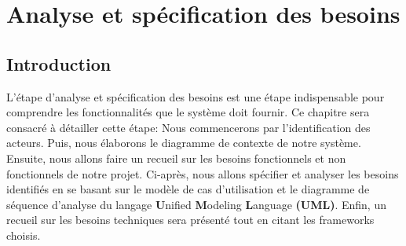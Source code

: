 \vfill 
\chapter{Analyse et spécification des besoins}
\label{chap:analyse-specification-besoins}
\mtcaddchapter
\section*{Introduction}
\justifying
L’étape d’analyse et spécification des besoins est une étape indispensable pour comprendre les fonctionnalités que le système doit fournir. Ce chapitre sera consacré à détailler cette étape: Nous commencerons par l’identification des acteurs. Puis, nous élaborons le diagramme de contexte de notre système. Ensuite, nous allons faire un recueil sur  les besoins fonctionnels et non fonctionnels de notre projet. Ci-après, nous allons spécifier et analyser les besoins identifiés en se basant sur le modèle de cas d’utilisation et le diagramme de séquence d'analyse du langage  \textbf{U}nified  \textbf{M}odeling  \textbf{L}anguage \textbf{(UML)}. Enfin, un recueil sur les besoins techniques sera présenté tout en citant les frameworks choisis.


